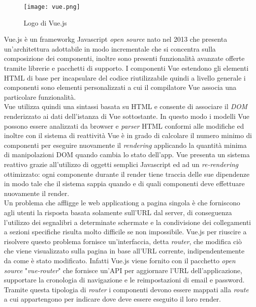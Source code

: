 \begin{figure}[H]
	\begin{center}
		\texttt{[image: vue.png]}
		\caption{Logo di Vue.js}
	\end{center}
\end{figure}
Vue.js è un \gls{frameworkg} Javascript \textit{open source} nato nel 2013 che presenta un'architettura adottabile in modo incrementale che si concentra sulla composizione dei componenti, inoltre sono presenti funzionalità avanzate offerte tramite librerie e pacchetti di supporto. I componenti Vue estendono gli elementi HTML di base per incapsulare del codice riutilizzabile quindi a livello generale i componenti sono elementi personalizzati a cui il compilatore Vue associa una particolare funzionalità.\\
Vue utilizza quindi una sintassi basata su HTML e consente di associare il \textit{DOM} renderizzato ai dati dell'istanza di Vue sottostante. In questo modo i modelli Vue possono essere analizzati da browser e \textit{parser} HTML conformi alle modifiche ed inoltre con il sistema di reattività Vue è in grado di calcolare il numero minimo di componenti per eseguire nuovamente il \textit{rendering} applicando la quantità minima di manipolazioni DOM quando cambia lo stato dell'app. Vue presenta un sistema reattivo grazie all'utilizzo di oggetti semplici Javascript ed ad un \textit{re-rendering} ottimizzato: ogni componente durante il render tiene traccia delle sue dipendenze in modo tale che il sistema sappia quando e di quali componenti deve effettuare nuovamente il render.\\
Un problema che affligge le \gls{web applicationg} a pagina singola è che forniscono agli utenti la risposta basata solamente sull'URL dal server, di conseguenza l'utilizzo dei segnalibri a determinate schermate e la condivisione dei collegamenti a sezioni specifiche risulta molto difficile se non impossibile. Vue.js per riuscire a risolvere questo problema fornisce un'interfaccia, detta \textit{router}, che modifica ciò che viene visualizzato sulla pagina in base all'URL corrente, indipendentemente da come è stato modificato. Infatti Vue.js viene fornito con il pacchetto \textit{open source} "\textit{vue-router}" che fornisce un'API per aggiornare l'URL dell'applicazione, supportare la cronologia di navigazione e le reimpostazioni di email e password. Tramite questa tipologia di \textit{router} i componenti devono essere mappati alla \textit{route} a cui appartengono per indicare dove deve essere eseguito il loro render.\\
